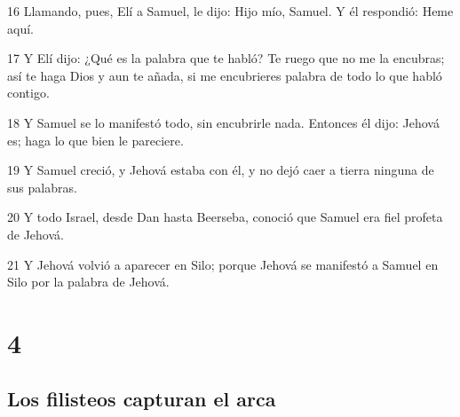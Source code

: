 \par 16 Llamando, pues, Elí a Samuel, le dijo: Hijo mío, Samuel. Y él respondió: Heme aquí.
\par 17 Y Elí dijo: ¿Qué es la palabra que te habló? Te ruego que no me la encubras; así te haga Dios y aun te añada, si me encubrieres palabra de todo lo que habló contigo.
\par 18 Y Samuel se lo manifestó todo, sin encubrirle nada. Entonces él dijo: Jehová es; haga lo que bien le pareciere.
\par 19 Y Samuel creció, y Jehová estaba con él, y no dejó caer a tierra ninguna de sus palabras.
\par 20 Y todo Israel, desde Dan hasta Beerseba, conoció que Samuel era fiel profeta de Jehová.
\par 21 Y Jehová volvió a aparecer en Silo; porque Jehová se manifestó a Samuel en Silo por la palabra de Jehová.

\chapter{4}

\section*{Los filisteos capturan el arca}

